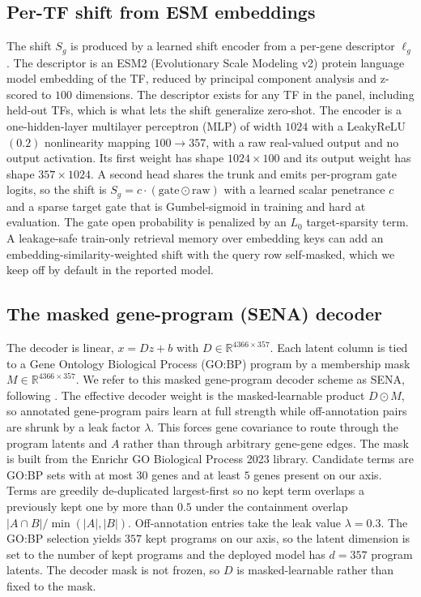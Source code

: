 \subsection{Per-TF shift from ESM embeddings}
The shift $S_g$ is produced by a learned shift encoder from a per-gene descriptor
$\ell_g$. The descriptor is an ESM2 (Evolutionary Scale Modeling v2) protein language
model embedding of the TF, reduced by principal component analysis and z-scored to $100$
dimensions. The descriptor exists for
any TF in the panel, including held-out TFs, which is what lets the shift generalize
zero-shot. The encoder is a one-hidden-layer multilayer perceptron (MLP) of width $1024$
with a LeakyReLU$(0.2)$ nonlinearity mapping $100\to357$, with a raw real-valued output and
no output activation. Its first weight has shape $1024\times100$ and its output weight has
shape $357\times1024$. A second head shares the trunk and emits per-program
gate logits, so the shift is $S_g=c\cdot(\text{gate}\odot\text{raw})$ with a learned scalar
penetrance $c$ and a sparse target gate that is Gumbel-sigmoid in
training and hard at evaluation. The gate open
probability is penalized by an $L_0$ target-sparsity term. A leakage-safe train-only
retrieval memory over embedding keys can add an embedding-similarity-weighted shift with
the query row self-masked, which we keep off by default in the reported model.

\subsection{The masked gene-program (SENA) decoder}
The decoder is linear, $x{=}Dz{+}b$ with $D\in\mathbb{R}^{4366\times357}$. Each latent
column is tied to a Gene Ontology Biological Process (GO:BP) program by a membership mask
$M\in\mathbb{R}^{4366\times357}$. We refer to this masked gene-program decoder scheme as
SENA, following \citep{sena2025}. The effective decoder weight is the masked-learnable
product $D\odot M$, so annotated gene-program pairs learn at full strength while
off-annotation pairs are shrunk by a leak factor $\lambda$. This forces gene covariance to
route through the program latents and $A$ rather than through arbitrary gene-gene edges.
The mask is built from the Enrichr GO Biological Process 2023 library. Candidate terms are
GO:BP sets with at most $30$ genes and at least $5$ genes present on our axis. Terms are
greedily de-duplicated largest-first so no kept term overlaps a previously kept one by more
than $0.5$ under the containment overlap
$\lvert A\cap B\rvert/\min(\lvert A\rvert,\lvert B\rvert)$. Off-annotation entries take the
leak value $\lambda{=}0.3$. The GO:BP selection yields $357$ kept programs on our axis, so
the latent dimension is set to the number of kept programs and the deployed model has
$d{=}357$ program latents. The decoder mask is not frozen, so $D$ is masked-learnable
rather than fixed to the mask.

